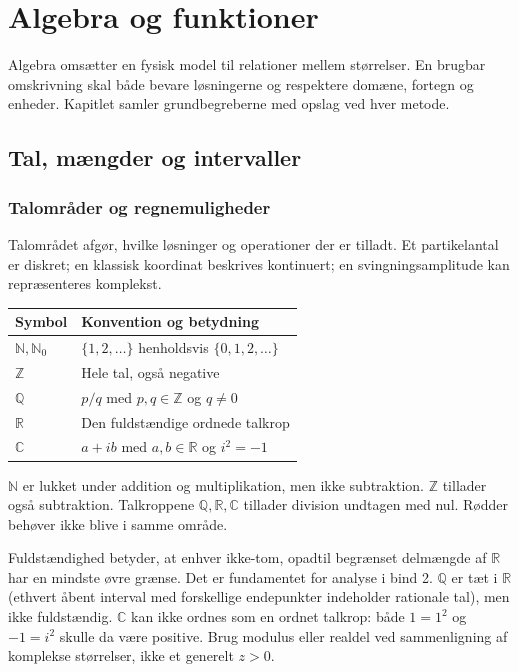 \chapter{Algebra og funktioner}
\label{ch:algebra}
Algebra omsætter en fysisk model til relationer mellem størrelser.
En brugbar omskrivning skal både bevare løsningerne og respektere domæne,
fortegn og enheder. Kapitlet samler grundbegreberne med opslag ved hver metode.

\section{Tal, mængder og intervaller}
\label{sec:tal-maengder}
\subsection{Talområder og regnemuligheder}
\label{sec:talomraader}
Talområdet afgør, hvilke løsninger og operationer der er tilladt.
Et partikelantal er diskret; en klassisk koordinat beskrives kontinuert;
en svingningsamplitude kan repræsenteres komplekst.
\begin{center}
\begin{tabular}{@{}lp{}@{}}
\toprule
Symbol & Konvention og betydning\\\midrule
$\mathbb N,\mathbb N_0$ & $\{1,2,\ldots\}$ henholdsvis $\{0,1,2,\ldots\}$\\
$\mathbb Z$ & Hele tal, også negative\\
$\mathbb Q$ & $p/q$ med $p,q\in\mathbb Z$ og $q\ne0$\\
$\mathbb R$ & Den fuldstændige ordnede talkrop\\
$\mathbb C$ & $a+ib$ med $a,b\in\mathbb R$ og $i^2=-1$\\\bottomrule
\end{tabular}
\end{center}
$\mathbb N$ er lukket under addition og multiplikation, men ikke
subtraktion. $\mathbb Z$ tillader også subtraktion. Talkroppene
$\mathbb Q,\mathbb R,\mathbb C$ tillader division undtagen med nul.
Rødder behøver ikke blive i samme område.

Fuldstændighed betyder, at enhver ikke-tom, opadtil begrænset delmængde af
$\mathbb R$ har en mindste øvre grænse. Det er fundamentet for analyse i
bind 2. $\mathbb Q$ er tæt i $\mathbb R$ (ethvert åbent interval med
forskellige endepunkter indeholder rationale tal), men ikke fuldstændig.
$\mathbb C$ kan ikke ordnes som en ordnet talkrop: både $1=1^2$ og
$-1=i^2$ skulle da være positive. Brug modulus eller realdel ved
sammenligning af komplekse størrelser, ikke et generelt $z>0$.

